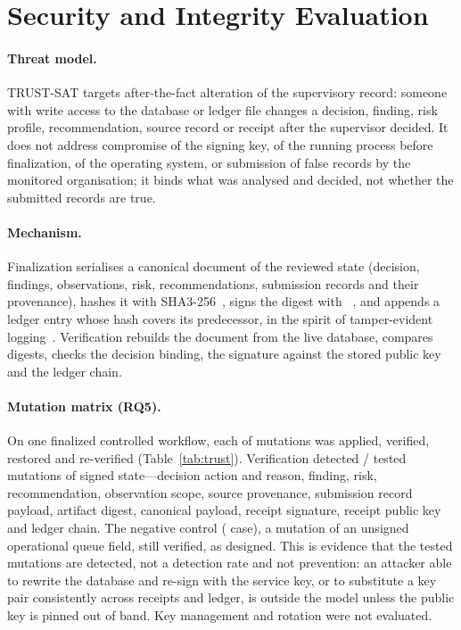 \section{Security and Integrity Evaluation}
\label{sec:integrity}

\paragraph{Threat model.}
TRUST-SAT targets after-the-fact alteration of the supervisory record: someone
with write access to the database or ledger file changes a decision, finding,
risk profile, recommendation, source record or receipt after the supervisor
decided. It does not address compromise of the signing key, of the running
process before finalization, of the operating system, or submission of false
records by the monitored organisation; it binds what was analysed and decided,
not whether the submitted records are true.

\paragraph{Mechanism.}
Finalization serialises a canonical document of the reviewed state (decision,
findings, observations, risk, recommendations, submission records and their
provenance), hashes it with SHA3-256~\cite{nist2015fips202}, signs the digest with
~\cite{nist2024fips204}, and appends a ledger entry whose hash
covers its predecessor, in the spirit of tamper-evident logging~\cite{schneier1999logs,crosby2009logging}.
Verification rebuilds the document from the live database, compares digests,
checks the decision binding, the signature against the stored public key and the
ledger chain.

\paragraph{Mutation matrix (RQ5).}
On one finalized controlled workflow, each of  mutations was applied,
verified, restored and re-verified (Table~\ref{tab:trust}). Verification detected
/ tested mutations of signed state---decision action
and reason, finding, risk, recommendation, observation scope, source provenance,
submission record payload, artifact digest, canonical payload, receipt signature,
receipt public key and ledger chain. The negative control ( case), a
mutation of an unsigned operational queue field, still verified, as designed. This is evidence
that the tested mutations are detected, not a detection rate and not prevention: an
attacker able to rewrite the database and re-sign with the service key, or to
substitute a key pair consistently across receipts and ledger, is outside the model
unless the public key is pinned out of band. Key management and
rotation were not evaluated.

